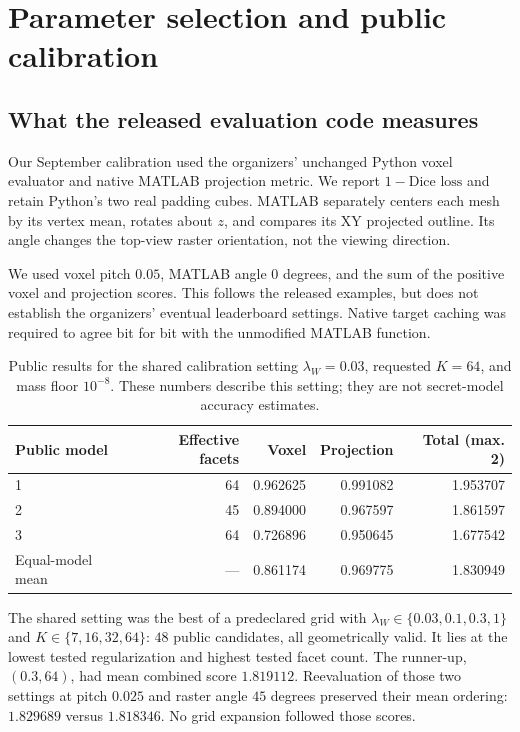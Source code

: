 \documentclass[11pt,a4paper]{article}
\begin{document}
\clearpage
\section{Parameter selection and public calibration}


\subsection*{What the released evaluation code measures}
Our September calibration used the organizers' unchanged Python voxel evaluator and native MATLAB projection metric. We report $1-\text{Dice loss}$ and retain Python's two real padding cubes. MATLAB separately centers each mesh by its vertex mean, rotates about $z$, and compares its XY projected outline. Its angle changes the top-view raster orientation, not the viewing direction.

We used voxel pitch $0.05$, MATLAB angle $0$ degrees, and the sum of the positive voxel and projection scores. This follows the released examples, but does not establish the organizers' eventual leaderboard settings. Native target caching was required to agree bit for bit with the unmodified MATLAB function.

\begin{table}[h]
\centering
\begin{tabular}{@{}lrrrr@{}}\toprule
Public model & Effective facets & Voxel & Projection & Total (max. 2) \\\midrule
1 & 64 & 0.962625 & 0.991082 & 1.953707 \\
2 & 45 & 0.894000 & 0.967597 & 1.861597 \\
3 & 64 & 0.726896 & 0.950645 & 1.677542 \\\midrule
Equal-model mean & --- & 0.861174 & 0.969775 & 1.830949 \\
\bottomrule\end{tabular}
\caption{Public results for the shared calibration setting $\lambda_W=0.03$, requested $K=64$, and mass floor $10^{-8}$. These numbers describe this setting; they are not secret-model accuracy estimates.}
\end{table}

The shared setting was the best of a predeclared grid with $\lambda_W\in\{0.03,0.1,0.3,1\}$ and $K\in\{7,16,32,64\}$: $48$ public candidates, all geometrically valid. It lies at the lowest tested regularization and highest tested facet count. The runner-up, $(0.3,64)$, had mean combined score $1.819112$. Reevaluation of those two settings at pitch $0.025$ and raster angle $45$ degrees preserved their mean ordering: $1.829689$ versus $1.818346$. No grid expansion followed those scores.
\end{document}
